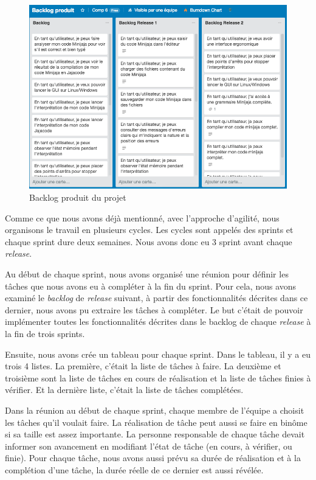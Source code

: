 \documentclass[a4paper,12pt]{article}
\begin{document}
\begin{figure}[H]
\begin{center}
	\includegraphics[scale=0.3]{backlogproduit}
	\caption{Backlog produit du projet}
\end{center}
\end{figure}

Comme ce que nous avons déjà mentionné, avec l'approche d'agilité, nous organisons le travail en plusieurs cycles. Les cycles sont appelés des sprints et chaque sprint dure deux semaines. Nous avons donc eu 3 sprint avant chaque \textit{release}. 

Au début de chaque sprint, nous avons organisé une réunion pour définir les tâches que nous avons eu à compléter à la fin du sprint. Pour cela, nous avons examiné le \textit{backlog} de \textit{release} suivant, à partir des fonctionnalités décrites dans ce dernier, nous avons pu extraire les tâches à compléter. Le but c'était de pouvoir implémenter toutes les fonctionnalités décrites dans le backlog de chaque \textit{release} à la fin de trois sprints.

Ensuite, nous avons crée un tableau pour chaque sprint. Dans le tableau, il y a eu trois 4 listes. La première, c'était la liste de tâches à faire. La deuxième et troisième sont la liste de tâches en cours de réalisation et la liste de tâches finies à vérifier. Et la dernière liste, c'était la liste de tâches complétées.

Dans la réunion au début de chaque sprint, chaque membre de l'équipe a choisit les tâches qu'il voulait faire. La réalisation de tâche peut aussi se faire en binôme si sa taille est assez importante. La personne responsable de chaque tâche devait informer son avancement en modifiant l'état de tâche (en cours, à vérifier, ou finie). Pour chaque tâche, nous avons aussi prévu sa durée de réalisation et à la complétion d'une tâche, la durée réelle de ce dernier est aussi révélée.
\end{document}
